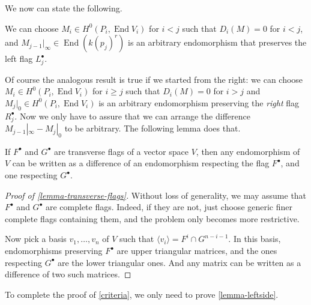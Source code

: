 \documentclass[11pt, two side, letterpaper, final]{amsart}
\DeclareMathOperator{\End}{End}
\begin{document}
We now can state the following.
\begin{lemma}
\label{lemma-leftside}
We can choose $M_i \in H^{0}(P_{i}, \End V_{i})$ for $i< j$ such that $D_i(M)=0$ for $i<j$,
and $M_{j-1}|_{\infty}\in \End (k(p_j)^r)$ is an arbitrary endomorphism that preserves the left flag 
$L^\bullet_j$.
\end{lemma}
Of course the analogous result is true if we started from the right: we can choose $M_i \in H^{0}(P_{i}, \End V_{i})$ for $i \geq j$ such that $D_i(M)=0$ for $i>j$ and $M_j|_0 \in  H^{0}(P_{i}, \End V_{i})$ is an arbitrary
endomorphism preserving the \emph{right} flag $R^\bullet_j$. Now we only have to assure that we can arrange the difference  $M_{j-1}|_{\infty}-M_j|_0$ to be arbitrary. The following lemma does that. 

\begin{lemma}
\label{lemma-transverse-flags}
If $F^\bullet$ and $G^\bullet$ are transverse flags of a vector space $V$, then any endomorphism of $V$ can be written as a difference of an endomorphism respecting the flag $F^\bullet$, and one respecting $G^\bullet$. 
\end{lemma}
\begin{proof}[Proof of \cref{lemma-transverse-flags}]
Without loss of generality, we may assume that $F^\bullet$ and $G^\bullet$ are complete flags. Indeed, if they are not, just choose generic finer complete flags containing them, and the problem only becomes more restrictive.

Now pick a basis $v_1,\ldots, v_n$ of $V$ such that $\langle v_i \rangle = F^i \cap G^{n-i-1}$. In this basis, 
endomorphisms preserving $F^\bullet$ are upper triangular matrices, and the ones respecting $G^\bullet$ are the lower
triangular ones. And any matrix can be written as a difference of two such matrices.
\end{proof}

To complete the proof of \cref{criteria}, we only need to prove \cref{lemma-leftside}.
\end{document}
